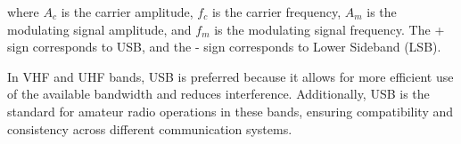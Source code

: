 where \( A_c \) is the carrier amplitude, \( f_c \) is the carrier frequency, \( A_m \) is the modulating signal amplitude, and \( f_m \) is the modulating signal frequency. The + sign corresponds to USB, and the - sign corresponds to Lower Sideband (LSB).

In VHF and UHF bands, USB is preferred because it allows for more efficient use of the available bandwidth and reduces interference. Additionally, USB is the standard for amateur radio operations in these bands, ensuring compatibility and consistency across different communication systems.

